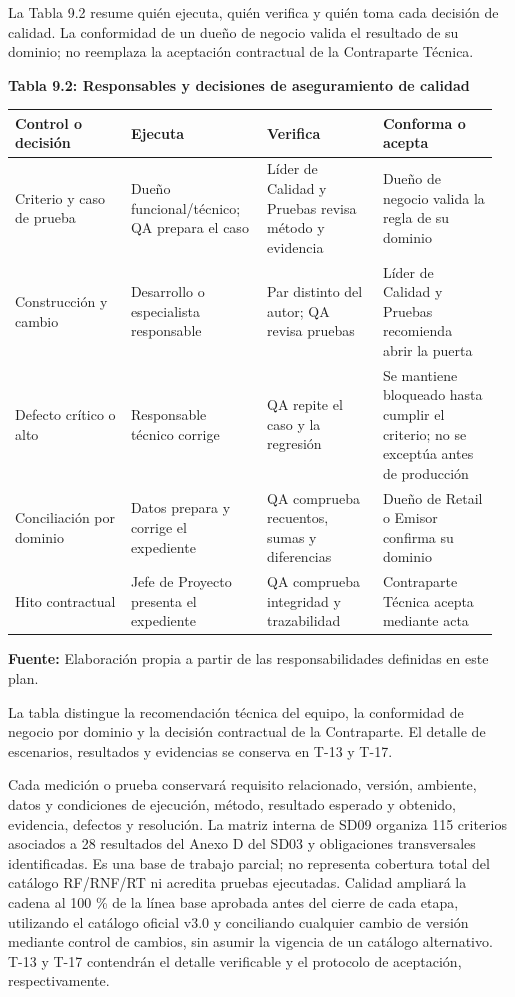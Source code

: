 \documentclass[11pt]{article}
\begin{document}
\clearpage

La Tabla 9.2 resume quién ejecuta, quién verifica y quién toma cada decisión de calidad. La conformidad de un dueño de negocio valida el resultado de su dominio; no reemplaza la aceptación contractual de la Contraparte Técnica.

\textbf{Tabla 9.2: Responsables y decisiones de aseguramiento de calidad}\label{tab:9-2}

\begin{longtable}{p{0.23\linewidth}p{0.27\linewidth}p{0.23\linewidth}p{0.23\linewidth}}
\toprule
Control o decisión & Ejecuta & Verifica & Conforma o acepta \\
\midrule
\endhead
Criterio y caso de prueba & Dueño funcional/técnico; QA prepara el caso & Líder de Calidad y Pruebas revisa método y evidencia & Dueño de negocio valida la regla de su dominio \\
Construcción y cambio & Desarrollo o especialista responsable & Par distinto del autor; QA revisa pruebas & Líder de Calidad y Pruebas recomienda abrir la puerta \\
Defecto crítico o alto & Responsable técnico corrige & QA repite el caso y la regresión & Se mantiene bloqueado hasta cumplir el criterio; no se exceptúa antes de producción \\
Conciliación por dominio & Datos prepara y corrige el expediente & QA comprueba recuentos, sumas y diferencias & Dueño de Retail o Emisor confirma su dominio \\
Hito contractual & Jefe de Proyecto presenta el expediente & QA comprueba integridad y trazabilidad & Contraparte Técnica acepta mediante acta \\
\bottomrule
\end{longtable}

\textbf{Fuente:} Elaboración propia a partir de las responsabilidades definidas en este plan.

La tabla distingue la recomendación técnica del equipo, la conformidad de negocio por dominio y la decisión contractual de la Contraparte. El detalle de escenarios, resultados y evidencias se conserva en T-13 y T-17.

Cada medición o prueba conservará requisito relacionado, versión, ambiente, datos y condiciones de ejecución, método, resultado esperado y obtenido, evidencia, defectos y resolución. La matriz interna de SD09 organiza 115 criterios asociados a 28 resultados del Anexo D del SD03 y obligaciones transversales identificadas. Es una base de trabajo parcial; no representa cobertura total del catálogo RF/RNF/RT ni acredita pruebas ejecutadas. Calidad ampliará la cadena al 100 \% de la línea base aprobada antes del cierre de cada etapa, utilizando el catálogo oficial v3.0 y conciliando cualquier cambio de versión mediante control de cambios, sin asumir la vigencia de un catálogo alternativo. T-13 y T-17 contendrán el detalle verificable y el protocolo de aceptación, respectivamente.
\end{document}
